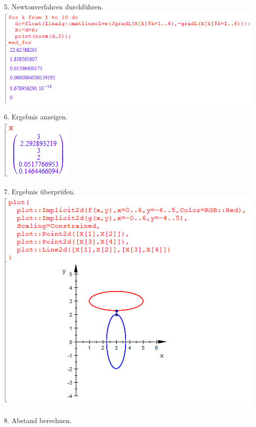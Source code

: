 \documentclass[11pt,final]{scrreprt}
\begin{document}
5. Newtonverfahren durchführen.\\

\includegraphics[scale=2.2]{images/abstandsproblem2/newton.png}

6. Ergebnis anzeigen.\\

\includegraphics[scale=2.2]{images/abstandsproblem2/result.png}

7. Ergebnis überprüfen.\\

\includegraphics[scale=2.2]{images/abstandsproblem2/plot.png}

8. Abstand berechnen.\\
\end{document}
